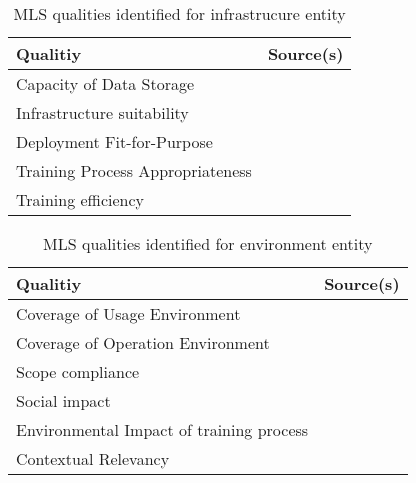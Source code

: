 \begin{table}[h]\label{tb:LiteratureQualitiesInfrastructure}
    \centering\footnotesize
    \begin{tabular}{p{} p{}}
        \textbf{Qualitiy} & \textbf{Source(s)} \\
        \toprule
        Capacity of Data Storage &~\cite{nakamichi_requirements-driven_2020} \\
        Infrastructure suitability &~\cite{siebert_construction_2021} \\
        Deployment Fit-for-Purpose &~\cite{ashmore_assuring_2021} \\
        Training Process Appropriateness &~\cite{nakamichi_requirements-driven_2020} \\
        Training efficiency &~\cite{siebert_construction_2021} \\
    \end{tabular}
    \caption{MLS qualities identified for infrastrucure entity}
\end{table}

\begin{table}[h]\label{tb:LiteratureQualitiesEnvironment}
    \centering\footnotesize
    \begin{tabular}{p{} p{}}
        \textbf{Qualitiy} & \textbf{Source(s)} \\
        \toprule
        Coverage of Usage Environment &~\cite{nakamichi_requirements-driven_2020} \\
        Coverage of Operation Environment &~\cite{nakamichi_requirements-driven_2020} \\
        Scope compliance &~\cite{siebert_construction_2021} \\
        Social impact &~\cite{siebert_construction_2021} \\
        Environmental Impact of training process &~\cite{siebert_construction_2021}\\
        Contextual Relevancy &~\cite{ashmore_assuring_2021} \\
    \end{tabular}
    \caption{MLS qualities identified for environment entity}
\end{table}

